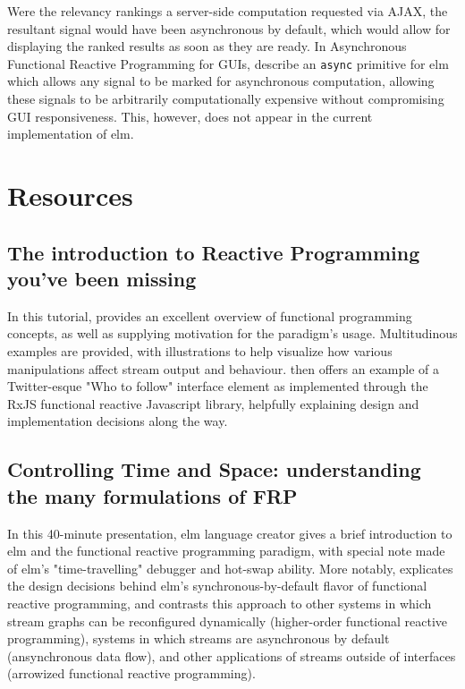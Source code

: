 \documentclass[12pt]{article}
\begin{document}
Were the relevancy rankings a server-side computation requested via AJAX, the resultant signal would have been asynchronous by default, which would allow for displaying the ranked results as soon as they are ready. In Asynchronous Functional Reactive Programming for GUIs, \cite{czaplicki_chong_2013} describe an \texttt{async} primitive for elm which allows any signal to be marked for asynchronous computation, allowing these signals to be arbitrarily computationally expensive without compromising GUI responsiveness. This, however, does not appear in the current implementation of elm.



\section{Resources}
\subsection{The introduction to Reactive Programming you've been missing}
In this tutorial, \citeauthor{staltz_2014} provides an excellent overview of functional programming concepts, as well as supplying motivation for the paradigm's usage. Multitudinous examples are provided, with illustrations to help visualize how various manipulations affect stream output and behaviour. \citeauthor{staltz_2014} then offers an example of a Twitter-esque "Who to follow" interface element as implemented through the RxJS functional reactive Javascript library, helpfully explaining design and implementation decisions along the way. 

\subsection{Controlling Time and Space: understanding the many formulations of FRP}
In this 40-minute presentation, elm language creator \citeauthor{czaplicki_2014} gives a brief introduction to elm and the functional reactive programming paradigm, with special note made of elm's "time-travelling" debugger and hot-swap ability. More notably, \citeauthor{czaplicki_2014} explicates the design decisions behind elm's synchronous-by-default flavor of functional reactive programming, and contrasts this approach to other systems in which stream graphs can be reconfigured dynamically (higher-order functional reactive programming), systems in which streams are asynchronous by default (ansynchronous data flow), and other applications of streams outside of interfaces (arrowized functional reactive programming). 
\end{document}
